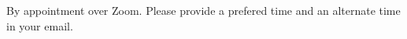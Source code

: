 \vspace*{5mm}
By appointment over Zoom.  Please provide a prefered time and an alternate time in your email.
